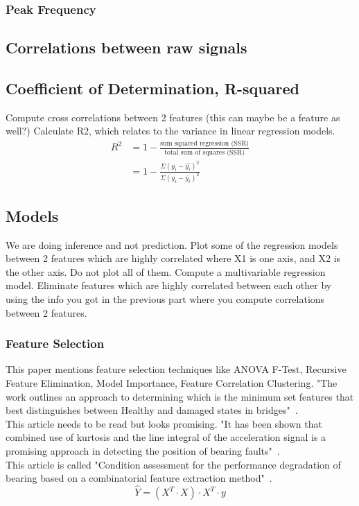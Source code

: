 \documentclass{article}
\begin{document}
\subsubsection{Peak Frequency}
\subsection{Correlations between raw signals}
\subsection{Coefficient of Determination, R-squared}
Compute cross correlations between 2 features (this can maybe be a feature as well?)
Calculate R2, which relates to the variance in linear regression models.
\begin{align*}
 R^2 &= 1 - \frac{\textrm{sum squared regression (SSR)}}{\textrm{total sum of squares (SSR)}} \\ 
 &= 1 - \frac{\Sigma(y_i - \hat{y_i})^2}{\Sigma(y_i - \bar{y_i})^2} 
\end{align*}
\subsection{Models}
We are doing inference and not prediction.
Plot some of the regression models between 2 features which are highly correlated where X1 is one axis, and X2 is the other axis. Do not plot all of them.
Compute a multivariable regression model.
Eliminate features which are highly correlated between each other by using the info you got in the previous part where you compute correlations between 2 features.
\subsubsection{Feature Selection}
This paper mentions feature selection techniques like ANOVA F-Test, Recursive Feature Elimination, Model Importance, Feature Correlation Clustering. "The work outlines an approach to determining which is the minimum set features that best distinguishes between Healthy and damaged states in bridges"~\cite{buckley2023feature}.\\
This article needs to be read but looks promising. "It has been shown that combined use of kurtosis and the line integral of the acceleration signal is a promising approach in detecting the position of bearing faults"~\cite{kateris2014machine}.\\
This article is called "Condition assessment for the performance degradation of bearing based on a combinatorial feature extraction method"~\cite{hong2014condition}.
$$ \hat{Y} = (X^T \cdot X) \cdot X^T \cdot y $$
\end{document}
